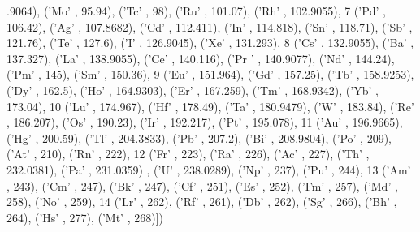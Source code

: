 \begin{DoxyCode}
      .9064), (\textcolor{stringliteral}{'Mo'} , 95.94), (\textcolor{stringliteral}{'Tc'} , 98), (\textcolor{stringliteral}{'Ru'} , 101.07), (\textcolor{stringliteral}{'Rh'} , 102.9055), 
7                              (\textcolor{stringliteral}{'Pd'} , 106.42), (\textcolor{stringliteral}{'Ag'} , 107.8682), (\textcolor{stringliteral}{'Cd'} , 112.411), (\textcolor{stringliteral}{'In'} , 114.818), (\textcolor{stringliteral}{'Sn'} 
      , 118.71), (\textcolor{stringliteral}{'Sb'} , 121.76), (\textcolor{stringliteral}{'Te'} , 127.6), (\textcolor{stringliteral}{'I'} , 126.9045), (\textcolor{stringliteral}{'Xe'} , 131.293), 
8                              (\textcolor{stringliteral}{'Cs'} , 132.9055), (\textcolor{stringliteral}{'Ba'} , 137.327), (\textcolor{stringliteral}{'La'} , 138.9055), (\textcolor{stringliteral}{'Ce'} , 140.116), (\textcolor{stringliteral}{'Pr
      '} , 140.9077), (\textcolor{stringliteral}{'Nd'} , 144.24), (\textcolor{stringliteral}{'Pm'} , 145), (\textcolor{stringliteral}{'Sm'} , 150.36), 
9                              (\textcolor{stringliteral}{'Eu'} , 151.964), (\textcolor{stringliteral}{'Gd'} , 157.25), (\textcolor{stringliteral}{'Tb'} , 158.9253), (\textcolor{stringliteral}{'Dy'} , 162.5), (\textcolor{stringliteral}{'Ho'} , 
      164.9303), (\textcolor{stringliteral}{'Er'} , 167.259), (\textcolor{stringliteral}{'Tm'} , 168.9342), (\textcolor{stringliteral}{'Yb'} , 173.04), 
10                              (\textcolor{stringliteral}{'Lu'} , 174.967), (\textcolor{stringliteral}{'Hf'} , 178.49), (\textcolor{stringliteral}{'Ta'} , 180.9479), (\textcolor{stringliteral}{'W'} , 183.84), (\textcolor{stringliteral}{'Re'} , 
      186.207), (\textcolor{stringliteral}{'Os'} , 190.23), (\textcolor{stringliteral}{'Ir'} , 192.217), (\textcolor{stringliteral}{'Pt'} , 195.078), 
11                              (\textcolor{stringliteral}{'Au'} , 196.9665), (\textcolor{stringliteral}{'Hg'} , 200.59), (\textcolor{stringliteral}{'Tl'} , 204.3833), (\textcolor{stringliteral}{'Pb'} , 207.2), (\textcolor{stringliteral}{'Bi'} ,
       208.9804), (\textcolor{stringliteral}{'Po'} , 209), (\textcolor{stringliteral}{'At'} , 210), (\textcolor{stringliteral}{'Rn'} , 222), 
12                              (\textcolor{stringliteral}{'Fr'} , 223), (\textcolor{stringliteral}{'Ra'} , 226), (\textcolor{stringliteral}{'Ac'} , 227), (\textcolor{stringliteral}{'Th'} , 232.0381), (\textcolor{stringliteral}{'Pa'} , 231.0359)
      , (\textcolor{stringliteral}{'}\textcolor{stringliteral}{U' , 238.0289), ('}Np' , 237), ('Pu' , 244), 
13                              (\textcolor{stringliteral}{'Am'} , 243), (\textcolor{stringliteral}{'Cm'} , 247), (\textcolor{stringliteral}{'Bk'} , 247), (\textcolor{stringliteral}{'Cf'} , 251), (\textcolor{stringliteral}{'Es'} , 252), (\textcolor{stringliteral}{'Fm'} , 
      257), (\textcolor{stringliteral}{'Md'} , 258), (\textcolor{stringliteral}{'No'} , 259), 
14                              (\textcolor{stringliteral}{'Lr'} , 262), (\textcolor{stringliteral}{'Rf'} , 261), (\textcolor{stringliteral}{'Db'} , 262), (\textcolor{stringliteral}{'Sg'} , 266), (\textcolor{stringliteral}{'Bh'} , 264), (\textcolor{stringliteral}{'Hs'} , 
      277), (\textcolor{stringliteral}{'Mt'} , 268)])
\end{DoxyCode}


